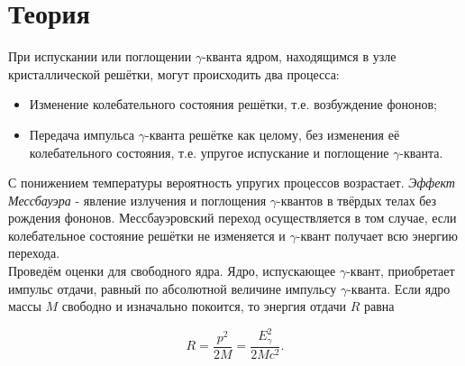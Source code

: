 \documentclass[a4paper,12pt]{article}
\theoremstyle{definition}
\begin{document}
\section*{Теория}
При испускании или поглощении $\gamma$-кванта ядром, находящимся в узле кристаллической решётки, могут происходить два процесса:
\begin{itemize}
\item Изменение колебательного состояния решётки, т.е. возбуждение фононов;
\item Передача импульса $\gamma$-кванта решётке как целому, без изменения её колебательного состояния, т.е. упругое испускание и поглощение $\gamma$-кванта.
\end{itemize}
С понижением температуры вероятность упругих процессов возрастает. \textit{Эффект Мессбауэра} - явление излучения и поглощения $\gamma$-квантов в твёрдых телах без рождения фононов. Мессбауэровский переход осуществляется в том случае, если колебательное состояние решётки не изменяется и $\gamma$-квант получает всю энергию перехода.\\
Проведём оценки для свободного ядра. Ядро, испускающее $\gamma$-квант, приобретает импульс отдачи, равный по абсолютной величине импульсу $\gamma$-кванта. Если ядро массы $M$ свободно и изначально покоится, то энергия отдачи $R$ равна

$$
R=\dfrac{p^2}{2M} = \dfrac{E_{\gamma}^2}{2Mc^2}.
$$
\end{document}
